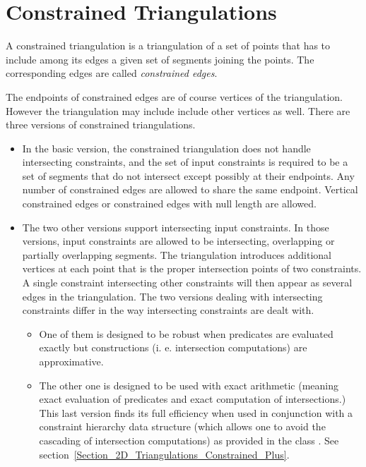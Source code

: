 \section{Constrained Triangulations}
\label{Section_2D_Triangulations_Constrained}

\label{Subsection_2D_Triangulations_Constrained_Description}
A constrained triangulation is a triangulation of a set of points
that has to include among its edges 
a given set of segments joining the points. The corresponding 
edges are called {\em constrained edges}. 

The endpoints of constrained edges are of course vertices of the
triangulation. However the triangulation may include
include other vertices as well.
There are three versions of  constrained triangulations.
\begin{itemize}
\item
In the basic version, the constrained triangulation 
does not handle intersecting constraints, and the set of input 
constraints is required to be a set of segments that do not intersect
except possibly at their endpoints. Any number of constrained edges
are allowed to share the same endpoint.  Vertical constrained edges or
constrained edges with null length are allowed.
\item 
The two other versions support intersecting input constraints.
In those versions, input constraints are allowed to be
intersecting, overlapping or partially
overlapping segments.
The triangulation introduces  additional  vertices at each point that
is the proper intersection points of  two 
constraints. A single constraint intersecting other
constraints will then appear as several edges in the triangulation.
The two versions dealing with intersecting constraints differ
in the way intersecting constraints are dealt with.
\begin{itemize}
\item
 One of them is
designed to be robust when predicates are evaluated exactly but
constructions (i. e.  intersection computations) are
approximative.
\item
The other one is designed to be used 
with exact arithmetic (meaning exact
evaluation of predicates and exact computation of intersections.)
This last version finds its full efficiency  when used in conjunction
with a constraint hierarchy data structure (which allows one to avoid the
cascading of intersection computations)
as provided in the class
. See
section~\ref{Section_2D_Triangulations_Constrained_Plus}.
\end{itemize}
\end{itemize}


